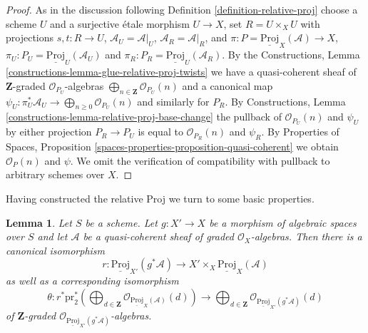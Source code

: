 \documentclass{stacks-project}
\theoremstyle{plain}
\newtheorem{lemma}[subsection]{Lemma}
\theoremstyle{definition}
\theoremstyle{remark}
\numberwithin{equation}{subsection}
\begin{document}
\begin{proof}
As in the discussion following Definition \ref{definition-relative-proj}
choose a scheme $U$ and a surjective \'etale morphism
$U \to X$, set $R = U \times_X U$ with projections $s, t : R \to U$,
$\mathcal{A}_U = \mathcal{A}|_U$, $\mathcal{A}_R = \mathcal{A}|_R$,
and $\pi : P = \underline{\text{Proj}}_X(\mathcal{A}) \to X$,
$\pi_U : P_U = \underline{\text{Proj}}_U(\mathcal{A}_U)$ and
$\pi_R : P_R = \underline{\text{Proj}}_U(\mathcal{A}_R)$.
By the
Constructions, Lemma \ref{constructions-lemma-glue-relative-proj-twists}
we have a quasi-coherent sheaf of $\mathbf{Z}$-graded
$\mathcal{O}_{P_U}$-algebras
$\bigoplus_{n \in \mathbf{Z}} \mathcal{O}_{P_U}(n)$
and a canonical map
$\psi_U : \pi_U^*\mathcal{A}_U \to \bigoplus_{n \geq 0} \mathcal{O}_{P_U}(n)$
and similarly for $P_R$. By
Constructions, Lemma \ref{constructions-lemma-relative-proj-base-change}
the pullback of $\mathcal{O}_{P_U}(n)$ and $\psi_U$ by either projection
$P_R \to P_U$ is equal to $\mathcal{O}_{P_R}(n)$ and $\psi_R$.
By Properties of Spaces, Proposition
\ref{spaces-properties-proposition-quasi-coherent}
we obtain $\mathcal{O}_{P}(n)$ and $\psi$.
We omit the verification of compatibility with pullback to
arbitrary schemes over $X$.
\end{proof}

\noindent
Having constructed the relative Proj we turn to some basic
properties.

\begin{lemma}
\label{lemma-relative-proj-base-change}
Let $S$ be a scheme. Let $g : X' \to X$ be a morphism of algebraic spaces
over $S$ and let $\mathcal{A}$ be a quasi-coherent sheaf
of graded $\mathcal{O}_X$-algebras. Then there is a canonical isomorphism
$$
r :
\underline{\text{Proj}}_{X'}(g^*\mathcal{A})
\longrightarrow
X' \times_X \underline{\text{Proj}}_X(\mathcal{A})
$$
as well as a corresponding isomorphism
$$
\theta :
r^*\text{pr}_2^*\left(\bigoplus\nolimits_{d \in \mathbf{Z}}
\mathcal{O}_{\underline{\text{Proj}}_X(\mathcal{A})}(d)\right)
\longrightarrow
\bigoplus\nolimits_{d \in \mathbf{Z}}
\mathcal{O}_{\underline{\text{Proj}}_{X'}(g^*\mathcal{A})}(d)
$$
of $\mathbf{Z}$-graded
$\mathcal{O}_{\underline{\text{Proj}}_{X'}(g^*\mathcal{A})}$-algebras.
\end{lemma}
\end{document}
